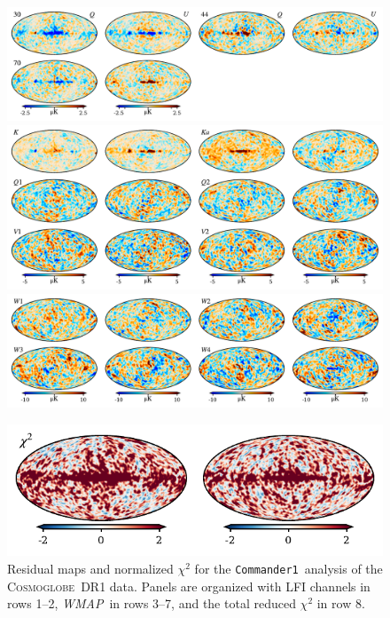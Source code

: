 \documentclass[twocolumn]{../../common/aa}
\def\WMAP{\emph{WMAP}}
\def\commanderone{\texttt{Commander1}}
\newcommand{\cosmoglobe}{\textsc{Cosmoglobe}}
\begin{document}
\begin{figure}
	\begin{center}
	\includegraphics[width=\linewidth]{figures/comm1_res_QU_LFI.pdf}\vspace{-0.3cm}
	\includegraphics[width=\linewidth]{figures/comm1_res_QU_K-V.pdf}\vspace{-0.3cm}
	\includegraphics[width=\linewidth]{figures/comm1_res_QU_W.pdf}\vspace{-0.3cm}
	\end{center}\vspace{-0.3cm}
	\includegraphics[width=0.5\linewidth]{figures/comm1_res_QU_chisq.pdf}
	\caption{Residual maps and normalized $\chi^2$ for the \commanderone\ analysis of the \cosmoglobe\ DR1 data. Panels are organized with LFI channels in rows 1--2, \WMAP\ in rows 3--7, and the total reduced $\chi^2$ in row 8.}
	\label{fig:res_QU}
\end{figure}
\end{document}
